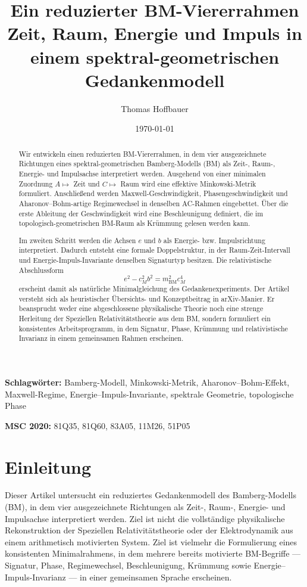 \documentclass[11pt,a4paper]{article}
\title{Ein reduzierter BM-Viererrahmen\\
	\large Zeit, Raum, Energie und Impuls in einem spektral-geometrischen Gedankenmodell}
\author{Thomas Hoffbauer}
\date{\today}
\theoremstyle{definition}
\theoremstyle{plain}
\begin{document}
	\maketitle
	
	\begin{abstract}
		Wir entwickeln einen reduzierten BM-Viererrahmen, in dem vier ausgezeichnete Richtungen eines spektral-geometrischen Bamberg-Modells (BM) als Zeit-, Raum-, Energie- und Impulsachse interpretiert werden. Ausgehend von einer minimalen Zuordnung $A\mapsto$ Zeit und $C\mapsto$ Raum wird eine effektive Minkowski-Metrik formuliert. Anschließend werden Maxwell-Geschwindigkeit, Phasengeschwindigkeit und Aharonov--Bohm-artige Regimewechsel in denselben AC-Rahmen eingebettet. Über die erste Ableitung der Geschwindigkeit wird eine Beschleunigung definiert, die im topologisch-geometrischen BM-Raum als Krümmung gelesen werden kann.
		
		Im zweiten Schritt werden die Achsen $e$ und $b$ als Energie- bzw. Impulsrichtung interpretiert. Dadurch entsteht eine formale Doppelstruktur, in der Raum-Zeit-Intervall und Energie-Impuls-Invariante denselben Signaturtyp besitzen. Die relativistische Abschlussform
		\[
		e^2 - c_M^2 b^2 = m_{\mathrm{BM}}^2 c_M^4
		\]
		erscheint damit als natürliche Minimalgleichung des Gedankenexperiments. Der Artikel versteht sich als heuristischer Übersichts- und Konzeptbeitrag in arXiv-Manier. Er beansprucht weder eine abgeschlossene physikalische Theorie noch eine strenge Herleitung der Speziellen Relativitätstheorie aus dem BM, sondern formuliert ein konsistentes Arbeitsprogramm, in dem Signatur, Phase, Krümmung und relativistische Invarianz in einem gemeinsamen Rahmen erscheinen.
	\end{abstract}
	
	\noindent\textbf{Schlagwörter:} Bamberg-Modell, Minkowski-Metrik, Aharonov--Bohm-Effekt, Maxwell-Regime, Energie--Impuls-Invariante, spektrale Geometrie, topologische Phase
	
	\medskip
	\noindent\textbf{MSC 2020:} 81Q35, 81Q60, 83A05, 11M26, 51P05
	
	\tableofcontents
	
	\section{Einleitung}
	
	Dieser Artikel untersucht ein reduziertes Gedankenmodell des Bamberg-Modells (BM), in dem vier ausgezeichnete Richtungen als Zeit-, Raum-, Energie- und Impulsachse interpretiert werden. Ziel ist nicht die vollständige physikalische Rekonstruktion der Speziellen Relativitätstheorie oder der Elektrodynamik aus einem arithmetisch motivierten System. Ziel ist vielmehr die Formulierung eines konsistenten Minimalrahmens, in dem mehrere bereits motivierte BM-Begriffe --- Signatur, Phase, Regimewechsel, Beschleunigung, Krümmung sowie Energie--Impuls-Invarianz --- in einer gemeinsamen Sprache erscheinen.
	
\end{document}
